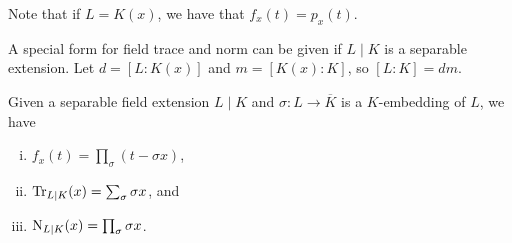 Note that if $L=K(x)$, we have that $f_x(t)=p_x(t)$.


A special form for field trace and norm can be given if $L\mid K$ is a separable extension. Let $d=[L:K(x)]$ and $m=[K(x):K]$, so $[L:K]=dm$.

\begin{proposition}
	Given a separable field extension $L\mid K$ and $\sigma : L\to\overline{K}$ is a $K$-embedding of $L$, we have
	\begin{enumerate}[(i)]
		\item $f_x(t)= \prod_\sigma(t-\sigma x)$,
		\item $\operatorname{Tr}_{L\mid K}(x) = \sum_\sigma \sigma x$, and
		\item $\operatorname{N}_{L\mid K}(x) = \prod_\sigma \sigma x$.
	\end{enumerate}
\end{proposition}

